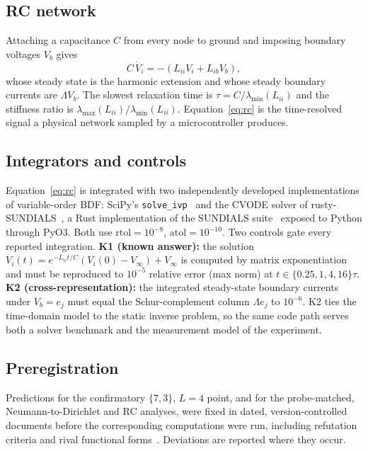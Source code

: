 \documentclass[11pt,a4paper]{article}
\begin{document}
\subsection{RC network}
Attaching a capacitance $C$ from every node to ground and imposing boundary voltages $V_b$ gives
\begin{equation}
C\,\dot V_i = -(L_{ii} V_i + L_{ib} V_b),
\label{eq:rc}
\end{equation}
whose steady state is the harmonic extension and whose steady boundary currents are $\Lambda V_b$. The slowest
relaxation time is $\tau = C/\lambda_{\min}(L_{ii})$ and the stiffness ratio is
$\lambda_{\max}(L_{ii})/\lambda_{\min}(L_{ii})$. Equation~\eqref{eq:rc} is the time-resolved signal a physical
network sampled by a microcontroller produces.

\subsection{Integrators and controls}
Equation~\eqref{eq:rc} is integrated with two independently developed implementations of variable-order BDF: SciPy's
\texttt{solve\_ivp}~\cite{SciPy2020} and the CVODE solver of rusty-SUNDIALS~\cite{RustySundials}, a Rust
implementation of the SUNDIALS suite~\cite{Hindmarsh2005} exposed to Python through PyO3. Both use
$\mathrm{rtol}=10^{-8}$, $\mathrm{atol}=10^{-10}$. Two controls gate every reported integration.
\textbf{K1 (known answer):} the solution
$V_i(t)=e^{-L_{ii}t/C}(V_i(0)-V_\infty)+V_\infty$ is computed by matrix exponentiation and must be reproduced to
$10^{-5}$ relative error (max norm) at $t\in\{0.25,1,4,16\}\tau$.
\textbf{K2 (cross-representation):} the integrated steady-state boundary currents under $V_b=e_j$ must equal the
Schur-complement column $\Lambda e_j$ to $10^{-6}$. K2 ties the time-domain model to the static inverse problem, so
the same code path serves both a solver benchmark and the measurement model of the experiment.

\subsection{Preregistration}
Predictions for the confirmatory $\{7,3\}$, $L=4$ point, and for the probe-matched, Neumann-to-Dirichlet and RC
analyses, were fixed in dated, version-controlled documents before the corresponding computations were run,
including refutation criteria and rival functional forms~\cite{TrackHRepo}. Deviations are reported where they occur.
\end{document}
